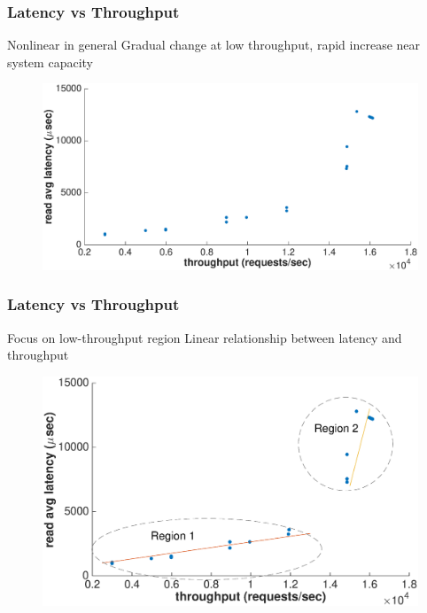 \documentclass{beamer}
\begin{document}
\begin{frame}
\frametitle{Latency vs Throughput}
\begin{block}{Nonlinear in general}
Gradual change at low throughput, rapid increase near system capacity 
\end{block}
\begin{figure}
    \centering
    \includegraphics[scale = 0.35]{two_regions_bare.eps}
\end{figure}
\end{frame}
\begin{frame}
\frametitle{Latency vs Throughput}
\begin{block}{Focus on low-throughput region}
Linear relationship between latency and throughput
\end{block}
\begin{figure}
    \centering
    \includegraphics[scale = 0.35]{two_regions.eps}
\end{figure}
\end{frame}
\end{document}
